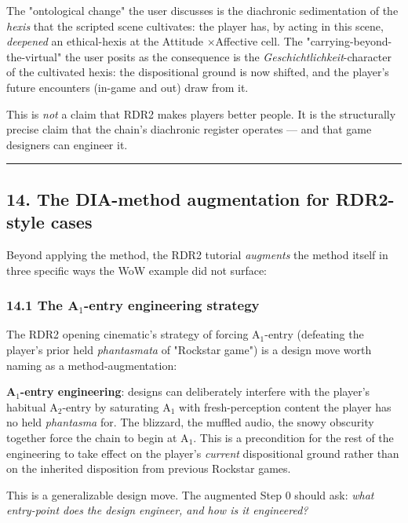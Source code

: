 \documentclass[11pt]{report}
\begin{document}
The "ontological change" the user discusses is the diachronic sedimentation of the \textit{hexis} that the scripted scene cultivates: the player has, by acting in this scene, \textit{deepened} an ethical-hexis at the Attitude $\times$\allowbreak  Affective cell. The "carrying-beyond-the-virtual" the user posits as the consequence is the \textit{Geschichtlichkeit}-character of the cultivated hexis: the dispositional ground is now shifted, and the player's future encounters (in-game and out) draw from it.


This is \textit{not} a claim that RDR2 makes players better people. It is the structurally precise claim that the chain's diachronic register operates — and that game designers can engineer it.


\vspace{0.4em}\hrule\vspace{0.8em}


\subsection{14. The DIA-method augmentation for RDR2-style cases}


Beyond applying the method, the RDR2 tutorial \textit{augments} the method itself in three specific ways the WoW example did not surface:


\subsubsection{14.1 The A$_1$-entry engineering strategy}


The RDR2 opening cinematic's strategy of forcing A$_1$-entry (defeating the player's prior held \textit{phantasmata} of "Rockstar game") is a design move worth naming as a method-augmentation:


\begin{diabox}
\textbf{A$_1$-entry engineering}: designs can deliberately interfere with the player's habitual A$_2$-entry by saturating A$_1$ with fresh-perception content the player has no held \textit{phantasma} for. The blizzard, the muffled audio, the snowy obscurity together force the chain to begin at A$_1$. This is a precondition for the rest of the engineering to take effect on the player's \textit{current} dispositional ground rather than on the inherited disposition from previous Rockstar games.

\end{diabox}


This is a generalizable design move. The augmented Step 0 should ask: \textit{what entry-point does the design engineer, and how is it engineered?}
\end{document}

